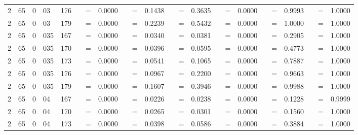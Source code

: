 \begin{tabular*}{260mm}{r@{.}lr@{.}lc|ccc:ccc:ccc:ccc:ccc|ccc}
		2&65	&	0&03	&	176	&	\nicefrac{}{} &=& 0.0000 & 	 &=& 0.1438 & 	 &=& 0.3635 & 	\nicefrac{}{} &=& 0.0000 & 	 &=& 0.9993 & 	 &=& 1.0000 \\ 
		2&65	&	0&03	&	179	&	\nicefrac{}{} &=& 0.0000 & 	 &=& 0.2239 & 	 &=& 0.5432 & 	\nicefrac{}{} &=& 0.0000 & 	 &=& 1.0000 & 	 &=& 1.0000 \\ 
		2&65	&	0&035	&	167	&	\nicefrac{}{} &=& 0.0000 & 	 &=& 0.0340 & 	 &=& 0.0381 & 	\nicefrac{}{} &=& 0.0000 & 	 &=& 0.2905 & 	 &=& 1.0000 \\ 
		2&65	&	0&035	&	170	&	\nicefrac{}{} &=& 0.0000 & 	 &=& 0.0396 & 	 &=& 0.0595 & 	\nicefrac{}{} &=& 0.0000 & 	 &=& 0.4773 & 	 &=& 1.0000 \\ 
		2&65	&	0&035	&	173	&	\nicefrac{}{} &=& 0.0000 & 	 &=& 0.0541 & 	 &=& 0.1065 & 	\nicefrac{}{} &=& 0.0000 & 	 &=& 0.7887 & 	 &=& 1.0000 \\ 
		2&65	&	0&035	&	176	&	\nicefrac{}{} &=& 0.0000 & 	 &=& 0.0967 & 	 &=& 0.2200 & 	\nicefrac{}{} &=& 0.0000 & 	 &=& 0.9663 & 	 &=& 1.0000 \\ 
		2&65	&	0&035	&	179	&	\nicefrac{}{} &=& 0.0000 & 	 &=& 0.1607 & 	 &=& 0.3946 & 	\nicefrac{}{} &=& 0.0000 & 	 &=& 0.9988 & 	 &=& 1.0000 \\ 
		2&65	&	0&04	&	167	&	\nicefrac{}{} &=& 0.0000 & 	 &=& 0.0226 & 	 &=& 0.0238 & 	\nicefrac{}{} &=& 0.0000 & 	 &=& 0.1228 & 	 &=& 0.9999 \\ 
		2&65	&	0&04	&	170	&	\nicefrac{}{} &=& 0.0000 & 	 &=& 0.0265 & 	 &=& 0.0301 & 	\nicefrac{}{} &=& 0.0000 & 	 &=& 0.1560 & 	 &=& 1.0000 \\ 
		2&65	&	0&04	&	173	&	\nicefrac{}{} &=& 0.0000 & 	 &=& 0.0398 & 	 &=& 0.0586 & 	\nicefrac{}{} &=& 0.0000 & 	 &=& 0.3884 & 	 &=& 1.0000 \\ 

\end{tabular*}
